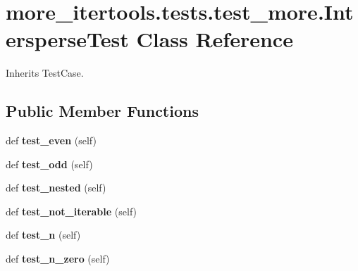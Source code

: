 \hypertarget{classmore__itertools_1_1tests_1_1test__more_1_1_intersperse_test}{}\section{more\+\_\+itertools.\+tests.\+test\+\_\+more.\+Intersperse\+Test Class Reference}
\label{classmore__itertools_1_1tests_1_1test__more_1_1_intersperse_test}


Inherits Test\+Case.

\subsection*{Public Member Functions}
\begin{DoxyCompactItemize}
\item 
\mbox{\label{classmore__itertools_1_1tests_1_1test__more_1_1_intersperse_test_acb14c0336105c3a3be6441d348b4a666}} 
def {\bfseries test\+\_\+even} (self)
\item 
\mbox{\label{classmore__itertools_1_1tests_1_1test__more_1_1_intersperse_test_a87d6337d9a9485b36a8f366c404a49f1}} 
def {\bfseries test\+\_\+odd} (self)
\item 
\mbox{\label{classmore__itertools_1_1tests_1_1test__more_1_1_intersperse_test_acc36bb9cbf1a3148e2a51a63fd01e20e}} 
def {\bfseries test\+\_\+nested} (self)
\item 
\mbox{\label{classmore__itertools_1_1tests_1_1test__more_1_1_intersperse_test_a3d5bfc29e229be92cfbeaf2effb522e1}} 
def {\bfseries test\+\_\+not\+\_\+iterable} (self)
\item 
\mbox{\label{classmore__itertools_1_1tests_1_1test__more_1_1_intersperse_test_a26a3a92bbf75acf384f20bee684afbb2}} 
def {\bfseries test\+\_\+n} (self)
\item 
\mbox{\label{classmore__itertools_1_1tests_1_1test__more_1_1_intersperse_test_ac67fa85992f9e4b2911510a88b8beacc}} 
def {\bfseries test\+\_\+n\+\_\+zero} (self)
\end{DoxyCompactItemize}


